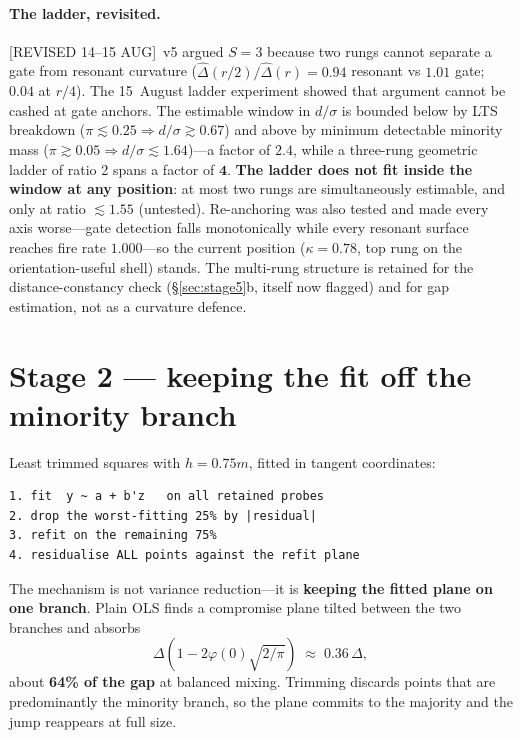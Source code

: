 \documentclass[11pt]{article}
\newcommand{\Dhat}{\hat{\Delta}}
\newcommand{\provtag}[2]{{\footnotesize\sffamily\textcolor{#1}{[#2]}}}
\newcommand{\REVI}{\provtag{openamber}{REVISED 14--15 AUG}}
\begin{document}
\paragraph{The ladder, revisited.} \REVI\ v5 argued $S = 3$ because two rungs cannot separate a
gate from resonant curvature ($\Dhat(r/2)/\Dhat(r) = 0.94$ resonant vs $1.01$ gate; $0.04$ at
$r/4$). The 15~August ladder experiment showed that argument cannot be cashed at gate anchors.
The estimable window in $d/\sigma$ is bounded below by LTS breakdown ($\pi \lesssim 0.25
\Rightarrow d/\sigma \gtrsim 0.67$) and above by minimum detectable minority mass ($\pi \gtrsim
0.05 \Rightarrow d/\sigma \lesssim 1.64$)---a factor of $\mathbf{2.4}$, while a three-rung
geometric ladder of ratio 2 spans a factor of $\mathbf{4}$. \textbf{The ladder does not fit
inside the window at any position}: at most two rungs are simultaneously estimable, and only at
ratio $\lesssim 1.55$ (untested). Re-anchoring was also tested and made every axis worse---gate
detection falls monotonically while every resonant surface reaches fire rate $1.000$---so the
current position ($\kappa = 0.78$, top rung on the orientation-useful shell) stands. The
multi-rung structure is retained for the distance-constancy check (\S\ref{sec:stage5}b, itself
now flagged) and for gap estimation, not as a curvature defence.

\section{Stage 2 --- keeping the fit off the minority branch}
\label{sec:stage2}

Least trimmed squares with $h = 0.75m$, fitted in tangent coordinates:

\begin{codebox}
\begin{verbatim}
1. fit  y ~ a + b'z   on all retained probes
2. drop the worst-fitting 25% by |residual|
3. refit on the remaining 75%
4. residualise ALL points against the refit plane
\end{verbatim}
\end{codebox}

The mechanism is not variance reduction---it is \textbf{keeping the fitted plane on one branch}.
Plain OLS finds a compromise plane tilted between the two branches and absorbs
\[
  \Delta\left(1 - 2\varphi(0)\sqrt{2/\pi}\right) \;\approx\; 0.36\,\Delta,
\]
about \textbf{64\% of the gap} at balanced mixing. Trimming discards points that are
predominantly the minority branch, so the plane commits to the majority and the jump reappears at
full size.
\end{document}
